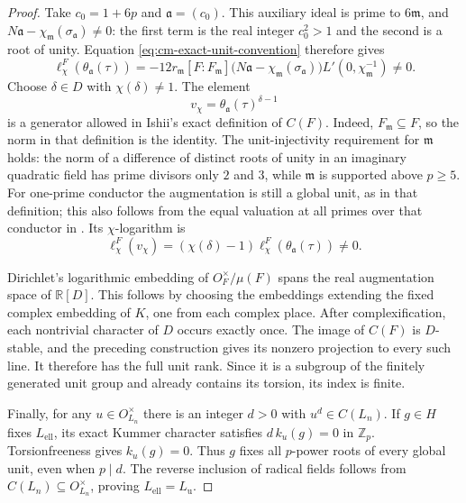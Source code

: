 \documentclass[11pt]{article}
\theoremstyle{definition}\newtheorem{definition}[theorem]{Definition}
\begin{document}
\begin{proof}
Take \(c_0=1+6p\) and \(\mathfrak a=(c_0)\).
This auxiliary ideal is prime to \(6\mathfrak m\), and
\(N\mathfrak a-\chi_{\mathfrak m}(\sigma_{\mathfrak a})\ne0\):
the first term is the real integer \(c_0^2>1\) and the second
is a root of unity.
Equation \eqref{eq:cm-exact-unit-convention} therefore gives
\[
 \ell_\chi^F(\theta_{\mathfrak a}(\tau))
  =-12r_{\mathfrak m}[F:F_{\mathfrak m}]
    \bigl(N\mathfrak a-\chi_{\mathfrak m}(\sigma_{\mathfrak a})\bigr)
                         L'(0,\chi_{\mathfrak m}^{-1})\ne0.
\]
Choose \(\delta\in D\) with \(\chi(\delta)\ne1\).
The element
\[
                       v_\chi=\theta_{\mathfrak a}(\tau)^{\delta-1}
\]
is a generator allowed in Ishii's exact definition of \(C(F)\).
Indeed, \(F_{\mathfrak m}\subseteq F\), so the norm in that
definition is the identity.
The unit-injectivity requirement for \(\mathfrak m\) holds:
the norm of a difference of distinct roots of unity in an
imaginary quadratic field has prime divisors only \(2\) and \(3\),
while \(\mathfrak m\) is supported above \(p\geq5\).
For one-prime conductor the augmentation is still a global unit,
as in that definition; this also follows from the equal valuation
at all primes over that conductor in
\cite[(5), p.~256]{Oukhaba2009}.
Its \(\chi\)-logarithm is
\[
                \ell_\chi^F(v_\chi)
                   =(\chi(\delta)-1)
                      \ell_\chi^F(\theta_{\mathfrak a}(\tau))\ne0 .
\]

Dirichlet's logarithmic embedding of
\(O_F^\times/\mu(F)\) spans the real augmentation space of
\(\mathbb R[D]\).
This follows by choosing the embeddings extending the fixed
complex embedding of \(K\), one from each complex place.
After complexification, each nontrivial character of \(D\)
occurs exactly once.
The image of \(C(F)\) is \(D\)-stable, and the preceding
construction gives its nonzero projection to every such line.
It therefore has the full unit rank.
Since it is a subgroup of the finitely generated unit group
and already contains its torsion, its index is finite.

Finally, for any \(u\in O_{L_n}^\times\) there is an integer
\(d>0\) with \(u^d\in C(L_n)\).
If \(g\in H\) fixes \(L_{\mathrm{ell}}\), its exact Kummer
character satisfies \(d\,k_u(g)=0\) in \(\mathbb Z_p\).
Torsionfreeness gives \(k_u(g)=0\).
Thus \(g\) fixes all \(p\)-power roots of every global unit,
even when \(p\mid d\).
The reverse inclusion of radical fields follows from
\(C(L_n)\subseteq O_{L_n}^\times\), proving
\(L_{\mathrm{ell}}=L_{\mathrm u}\).
\end{proof}
\end{document}
